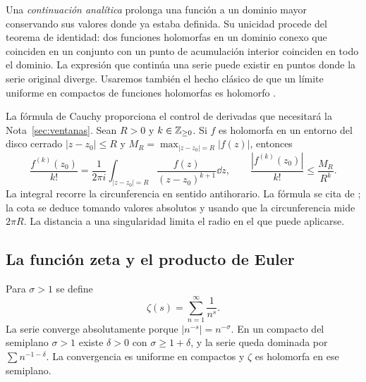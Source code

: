 Una \emph{continuación analítica} prolonga una función a un dominio mayor
conservando sus valores donde ya estaba definida. Su unicidad procede del
teorema de identidad: dos funciones holomorfas en un dominio conexo que
coinciden en un conjunto con un punto de acumulación interior coinciden
en todo el dominio. La expresión que continúa una serie puede existir en
puntos donde la serie original diverge. Usaremos también el hecho clásico
de que un límite uniforme en compactos de funciones holomorfas es
holomorfo \cite[§§1.9--1.10]{dlmf-analisis}.

La fórmula de Cauchy proporciona el control de derivadas que necesitará
la Nota~\ref{sec:ventanas}. Sean $R>0$ y $k\in\mathbb{Z}_{\ge0}$.
Si $f$ es holomorfa en un entorno del disco
cerrado $|z-z_0|\le R$ y $M_R=\max_{|z-z_0|=R}|f(z)|$, entonces
\[
 \frac{f^{(k)}(z_0)}{k!}
   =\frac1{2\pi i}\int_{|z-z_0|=R}\frac{f(z)}{(z-z_0)^{k+1}}\dd z,
 \qquad
 \frac{|f^{(k)}(z_0)|}{k!}\le\frac{M_R}{R^k}.
\]
La integral recorre la circunferencia en sentido antihorario. La fórmula
se cita de \cite[ecuación 1.9.31]{dlmf-analisis}; la cota se deduce
tomando valores absolutos y usando que la circunferencia mide $2\pi R$.
La distancia a una singularidad limita el radio en el que puede aplicarse.

\subsection{La función zeta y el producto de Euler}

Para $\sigma>1$ se define
\begin{equation}
 \zeta(s)=\sum_{n=1}^{\infty}\frac1{n^s}.
 \label{eq:intro-zeta}
\end{equation}
La serie converge absolutamente porque $|n^{-s}|=n^{-\sigma}$.
En un compacto del semiplano $\sigma>1$ existe $\delta>0$ con
$\sigma\ge1+\delta$, y la serie queda dominada por
$\sum n^{-1-\delta}$. La convergencia es uniforme en compactos y
$\zeta$ es holomorfa en ese semiplano.

